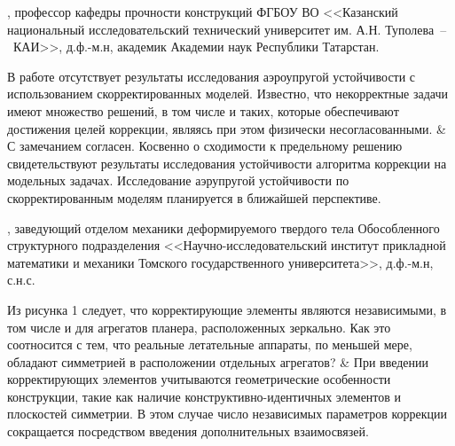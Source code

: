 \begin{frame}
	\beginSkip
	, профессор кафедры прочности конструкций ФГБОУ ВО <<Казанский национальный исследовательский технический университет им. А.Н. Туполева~--~КАИ>>, д.ф.-м.н, академик Академии наук Республики Татарстан. \\
	\begin{comtblr}{}
		В работе отсутствует результаты исследования аэроупругой устойчивости с использованием скорректированных моделей. Известно, что некорректные задачи имеют множество решений, в том числе и таких, которые обеспечивают достижения целей коррекции, являясь при этом физически несогласованными.
		&
		С замечанием согласен. Косвенно о сходимости к предельному решению свидетельствуют результаты исследования устойчивости алгоритма коррекции на модельных задачах. Исследование аэрупругой устойчивости по скорректированным моделям планируется в ближайшей перспективе.
	\end{comtblr}
\end{frame}

\begin{frame}
	\beginSkip
	, заведующий отделом механики деформируемого твердого тела Обособленного структурного подразделения <<Научно-исследовательский институт прикладной математики и механики Томского государственного университета>>, д.ф.-м.н, с.н.с. \\
	\begin{comtblr}{15em}
		Из рисунка 1 следует, что корректирующие элементы являются независимыми, в том числе и для агрегатов планера, расположенных зеркально. Как это соотносится с тем, что реальные летательные аппараты, по меньшей мере, обладают симметрией в расположении отдельных агрегатов?
		&
		При введении корректирующих элементов учитываются геометрические особенности конструкции, такие как наличие конструктивно-идентичных элементов и плоскостей симметрии. В этом случае число независимых параметров коррекции сокращается посредством введения дополнительных взаимосвязей.
	\end{comtblr}
\end{frame}

